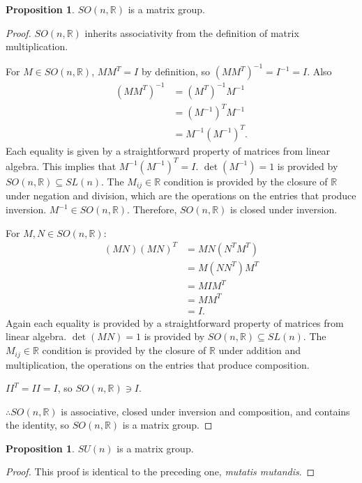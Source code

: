 \documentclass[12pt]{article}
\newcommand{\R}{\mathbb{R}}
\newcommand{\sun}{SU (n)}
\newcommand{\son}{SO (n, \R)}
\theoremstyle{definition}
\newtheorem{prop}[them]{Proposition}
\theoremstyle{definition}
\theoremstyle{definition}
\theoremstyle{definition}
\theoremstyle{definition}
\theoremstyle{definition}
\theoremstyle{definition}
\theoremstyle{definition}
\begin{document}
\begin{prop}$\son$ is a matrix group.\end{prop}
\begin{proof}
\par{$\son$ inherits associativity from the definition of matrix multiplication.}
\par{For $M \in \son$, $MM^T = I$ by definition,
so ${(MM^T)}^{-1} = I^{-1} = I$. Also
\[\begin{aligned} {(MM^T)}^{-1} & =
{(M^T)}^{-1}M^{-1} \\ & = {(M^{-1})}^T M^{-1} \\ &
= M^{-1}{(M^{-1})}^T.\end{aligned}\] Each equality
is given by a straightforward property of matrices
from linear algebra. This implies that
$M^{-1}{(M^{-1})}^T = I$. $\det(M^{-1}) = 1$ is
provided by $\son \subseteq SL(n)$. The $M_{ij}
\in \R$ condition is provided by the closure of
$\R$ under negation and division, which are the
operations on the entries that produce inversion.
$M^{-1} \in \son$. Therefore, $\son$ is closed
under inversion.}
\par{For $M, N \in \son$:
\[\begin{aligned}(MN){(MN)}^{T} & = MN(N^{T}M^{T})
\\ & = M(NN^T)M^T \\ & = MIM^T \\ & = MM^T \\ & =
I.\end{aligned}\] Again each equality is provided
by a straightforward property of matrices from
linear algebra. $\det(MN) = 1$ is provided by
$\son \subseteq SL(n)$. The $M_{ij} \in \R$
condition is provided by the closure of $\R$ under
addition and multiplication, the operations on the
entries that produce composition.}
\par{$II^T = II = I$, so $\son \ni I$.}
\par{$\therefore \son$ is associative, closed under inversion and composition, and contains the identity, so $\son$ is a matrix group.}
\end{proof}

\begin{prop}$\sun$ is a matrix group.\end{prop}
\begin{proof}
This proof is identical to the preceding one, \textit{mutatis
mutandis}. 
\end{proof}
\end{document}
